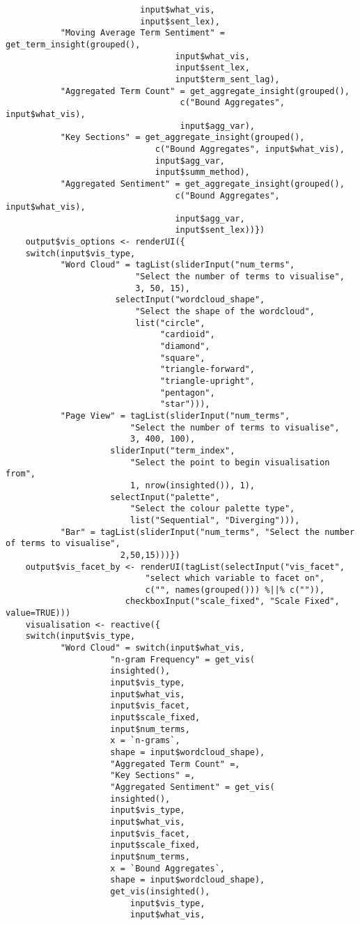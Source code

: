 \documentclass[a4paper, 11pt]{article}
\begin{document}
\begin{verbatim}
						   input$what_vis,
						   input$sent_lex),
	       "Moving Average Term Sentiment" = get_term_insight(grouped(),
								  input$what_vis,
								  input$sent_lex,
								  input$term_sent_lag),
	       "Aggregated Term Count" = get_aggregate_insight(grouped(),
							       c("Bound Aggregates", input$what_vis),
							       input$agg_var),
	       "Key Sections" = get_aggregate_insight(grouped(),
						      c("Bound Aggregates", input$what_vis),
						      input$agg_var,
						      input$summ_method),
	       "Aggregated Sentiment" = get_aggregate_insight(grouped(),
							      c("Bound Aggregates", input$what_vis),
							      input$agg_var,
							      input$sent_lex))})
    output$vis_options <- renderUI({
	switch(input$vis_type,
	       "Word Cloud" = tagList(sliderInput("num_terms",
						  "Select the number of terms to visualise",
						  3, 50, 15),
				      selectInput("wordcloud_shape",
						  "Select the shape of the wordcloud",
						  list("circle",
						       "cardioid",
						       "diamond",
						       "square",
						       "triangle-forward",
						       "triangle-upright",
						       "pentagon",
						       "star"))),
	       "Page View" = tagList(sliderInput("num_terms",
						 "Select the number of terms to visualise",
						 3, 400, 100),
				     sliderInput("term_index",
						 "Select the point to begin visualisation from",
						 1, nrow(insighted()), 1),
				     selectInput("palette",
						 "Select the colour palette type",
						 list("Sequential", "Diverging"))),
	       "Bar" = tagList(sliderInput("num_terms", "Select the number of terms to visualise",
					   2,50,15)))})
    output$vis_facet_by <- renderUI(tagList(selectInput("vis_facet",
							"select which variable to facet on",
							c("", names(grouped())) %||% c("")),
					    checkboxInput("scale_fixed", "Scale Fixed", value=TRUE)))
    visualisation <- reactive({
	switch(input$vis_type,
	       "Word Cloud" = switch(input$what_vis,
				     "n-gram Frequency" = get_vis(
					 insighted(),
					 input$vis_type,
					 input$what_vis,
					 input$vis_facet,
					 input$scale_fixed,
					 input$num_terms,
					 x = `n-grams`,
					 shape = input$wordcloud_shape),
				     "Aggregated Term Count" =,
				     "Key Sections" =,
				     "Aggregated Sentiment" = get_vis(
					 insighted(),
					 input$vis_type,
					 input$what_vis,
					 input$vis_facet,
					 input$scale_fixed,
					 input$num_terms,
					 x = `Bound Aggregates`,
					 shape = input$wordcloud_shape),
				     get_vis(insighted(),
					     input$vis_type,
					     input$what_vis,

\end{verbatim}
\end{document}
